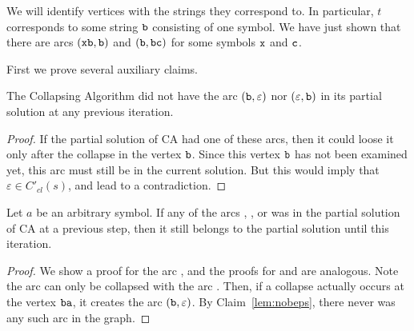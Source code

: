We will identify vertices with the strings they correspond to. In particular, $ t $ corresponds to some string $ \tt b $ consisting of one symbol. We have just shown that there are arcs $ ({\tt xb}, {\tt b}) $ and $ ({\tt b}, {\tt bc}) $ for some symbols $ {\tt x} $ and $ {\tt c} $.

First we prove several auxiliary claims.

\begin{claim}
\label{lem:nobeps}
The Collapsing Algorithm did not have the arc $ ({\tt b}, \varepsilon) $ nor $ (\varepsilon, {\tt b}) $ in its partial solution at any previous iteration.
\end{claim}
\begin{proof}
If the partial solution of CA had one of these arcs, then it could loose it only after the collapse in the vertex $ {\tt b} $. Since this vertex $ {\tt b} $ has not been examined yet, this arc must still be in the current solution. But this would imply that $ \varepsilon \in C'_{cl} (s) $, and lead to a contradiction.
\end{proof}

\begin{claim}
\label{lem:bccsave}
Let $a$ be an arbitrary symbol. If any of the arcs , , or  was in the partial solution of CA at a previous step, then it still belongs to the partial solution until this iteration.
\end{claim}
\begin{proof}
We show a proof for the arc , and the proofs for  and  are analogous.  Note the arc  can only be collapsed with the arc . Then, if a collapse actually occurs at the vertex $ {\tt ba} $, it creates the arc $ ({\tt b}, \varepsilon) $. By Claim~\ref{lem:nobeps}, there never was any such arc in the graph. \end{proof}

